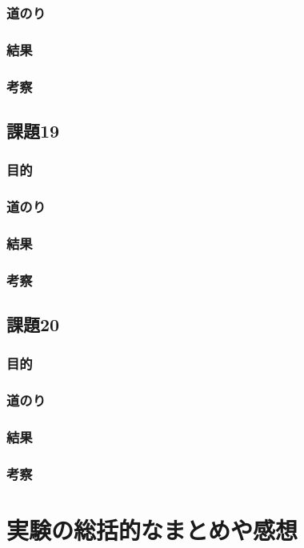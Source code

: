 \documentclass[a4paper]{jarticle}
\begin{document}
\subsubsection{道のり}
\subsubsection{結果}
\subsubsection{考察}
\subsection{課題19}
\subsubsection{目的}
\subsubsection{道のり}
\subsubsection{結果}
\subsubsection{考察}
\subsection{課題20}
\subsubsection{目的}
\subsubsection{道のり}
\subsubsection{結果}
\subsubsection{考察}
\section{実験の総括的なまとめや感想}
\end{document}
